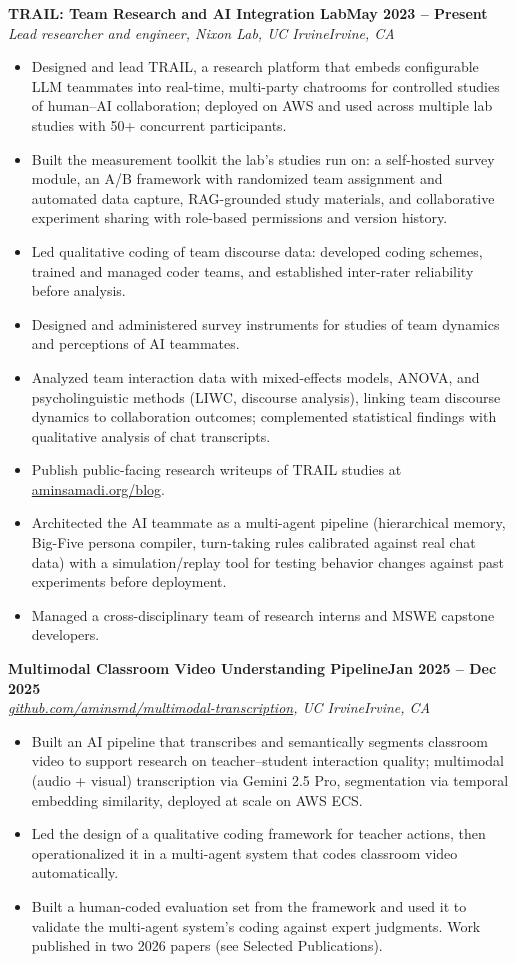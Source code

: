 \documentclass[10pt,letterpaper]{article}
\newcommand{\entry}[4]{%
  \par\textbf{#1}\hfill\textbf{#2}\\
  \textit{#3}\hfill\textit{#4}\par\vspace{1pt}}
\begin{document}
\entry{TRAIL: Team Research and AI Integration Lab}{May 2023 -- Present}
  {Lead researcher and engineer, Nixon Lab, UC Irvine}{Irvine, CA}
\begin{itemize}
  \item Designed and lead TRAIL, a research platform that embeds configurable LLM teammates into real-time, multi-party chatrooms for controlled studies of human--AI collaboration; deployed on AWS and used across multiple lab studies with 50+ concurrent participants.
  \item Built the measurement toolkit the lab's studies run on: a self-hosted survey module, an A/B framework with randomized team assignment and automated data capture, RAG-grounded study materials, and collaborative experiment sharing with role-based permissions and version history.
  \item Led qualitative coding of team discourse data: developed coding schemes, trained and managed coder teams, and established inter-rater reliability before analysis.
  \item Designed and administered survey instruments for studies of team dynamics and perceptions of AI teammates.
  \item Analyzed team interaction data with mixed-effects models, ANOVA, and psycholinguistic methods (LIWC, discourse analysis), linking team discourse dynamics to collaboration outcomes; complemented statistical findings with qualitative analysis of chat transcripts.
  \item Publish public-facing research writeups of TRAIL studies at \href{https://aminsamadi.org/blog}{aminsamadi.org/blog}.
  \item Architected the AI teammate as a multi-agent pipeline (hierarchical memory, Big-Five persona compiler, turn-taking rules calibrated against real chat data) with a simulation/replay tool for testing behavior changes against past experiments before deployment.
  \item Managed a cross-disciplinary team of research interns and MSWE capstone developers.
\end{itemize}

\entry{Multimodal Classroom Video Understanding Pipeline}{Jan 2025 -- Dec 2025}
  {\href{https://github.com/aminsmd/multimodal-transcription}{github.com/aminsmd/multimodal-transcription}, UC Irvine}{Irvine, CA}
\begin{itemize}
  \item Built an AI pipeline that transcribes and semantically segments classroom video to support research on teacher--student interaction quality; multimodal (audio + visual) transcription via Gemini 2.5 Pro, segmentation via temporal embedding similarity, deployed at scale on AWS ECS.
  \item Led the design of a qualitative coding framework for teacher actions, then operationalized it in a multi-agent system that codes classroom video automatically.
  \item Built a human-coded evaluation set from the framework and used it to validate the multi-agent system's coding against expert judgments. Work published in two 2026 papers (see Selected Publications).
\end{itemize}
\end{document}
